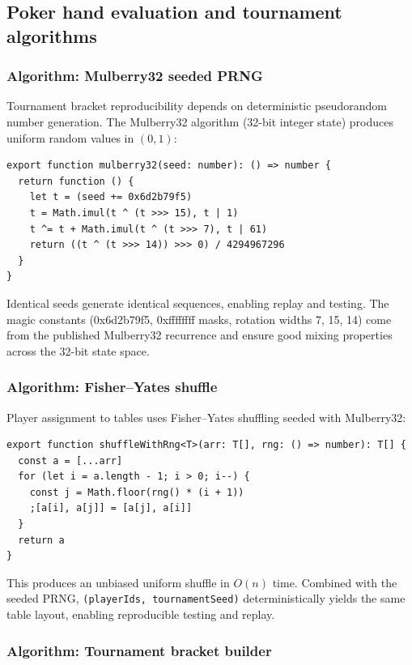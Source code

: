 \documentclass[11pt,a4paper]{article}
\begin{document}
\subsection{Poker hand evaluation and tournament algorithms}

\subsubsection{Algorithm: Mulberry32 seeded PRNG}

Tournament bracket reproducibility depends on deterministic pseudorandom number generation. The Mulberry32 algorithm (32-bit integer state) produces uniform random values in $(0,1)$:

\begin{verbatim}
export function mulberry32(seed: number): () => number {
  return function () {
    let t = (seed += 0x6d2b79f5)
    t = Math.imul(t ^ (t >>> 15), t | 1)
    t ^= t + Math.imul(t ^ (t >>> 7), t | 61)
    return ((t ^ (t >>> 14)) >>> 0) / 4294967296
  }
}
\end{verbatim}

\noindent Identical seeds generate identical sequences, enabling replay and testing. The magic constants (0x6d2b79f5, 0xffffffff masks, rotation widths 7, 15, 14) come from the published Mulberry32 recurrence and ensure good mixing properties across the 32-bit state space.

\subsubsection{Algorithm: Fisher--Yates shuffle}

Player assignment to tables uses Fisher--Yates shuffling seeded with Mulberry32:

\begin{verbatim}
export function shuffleWithRng<T>(arr: T[], rng: () => number): T[] {
  const a = [...arr]
  for (let i = a.length - 1; i > 0; i--) {
    const j = Math.floor(rng() * (i + 1))
    ;[a[i], a[j]] = [a[j], a[i]]
  }
  return a
}
\end{verbatim}

\noindent This produces an unbiased uniform shuffle in $O(n)$ time. Combined with the seeded PRNG, \texttt{(playerIds, tournamentSeed)} deterministically yields the same table layout, enabling reproducible testing and replay.

\subsubsection{Algorithm: Tournament bracket builder}
\end{document}
